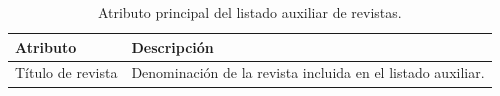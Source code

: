 \documentclass[11pt,spanish,listoffigures,listoftables]{tfgetsinf}
\begin{document}
\begin{table}[H]
\centering
\small
\renewcommand{\arraystretch}{1.25}
\begin{tabularx}{\textwidth}{
>{\raggedright\arraybackslash}p{4cm}
>{\raggedright\arraybackslash}X
}
\toprule
\textbf{Atributo} & \textbf{Descripción} \\
\midrule
Título de revista & Denominación de la revista incluida en el listado auxiliar. \\
\bottomrule
\end{tabularx}
\caption{Atributo principal del listado auxiliar de revistas.}
\label{tab:atributos_titulos_revistas}
\end{table}

%
%




\end{document}
